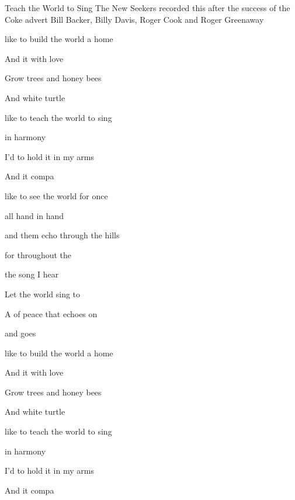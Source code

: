 \begin{SBSong}{Teach the World to Sing}
  {The New Seekers recorded this after the success of the Coke advert}
  {Bill Backer, Billy Davis, Roger Cook and Roger Greenaway}
  \begin{SBVerse}
     like to build the world a home
    
    And  it with love
    
    Grow  trees and honey bees
    
    And  white turtle 
  \end{SBVerse}
  \begin{SBVerse}
     like to teach the world to sing 
    
	in  harmony
	
	I'd  to hold it in my arms
	
	And  it compa
  \end{SBVerse}
  \begin{SBVerse}
     like to see the world for once
    
	all  hand in hand
	
	and  them echo through the hills
	
	for  throughout the 
  \end{SBVerse}
  \begin{SBVerse}
     the song I hear

    Let the world sing to

    A  of peace that echoes on 

    and  goes 
  \end{SBVerse}
  \begin{SBVerse}
     like to build the world a home
    
    And  it with love
    
    Grow  trees and honey bees
    
    And  white turtle 
  \end{SBVerse}
  \begin{SBVerse}
     like to teach the world to sing 
    
	in  harmony
	
	I'd  to hold it in my arms
	
	And  it compa
  \end{SBVerse}
\end{SBSong}

